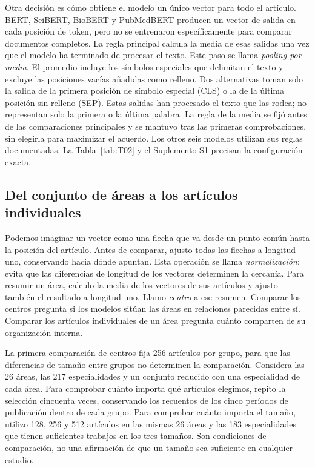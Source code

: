 \documentclass[12pt]{article}
\begin{document}
Otra decisión es cómo obtiene el modelo un único vector para todo el artículo. BERT, SciBERT, BioBERT y PubMedBERT producen un vector de salida en cada posición de token, pero no se entrenaron específicamente para comparar documentos completos. La regla principal calcula la media de esas salidas una vez que el modelo ha terminado de procesar el texto. Este paso se llama \emph{pooling por media}. El promedio incluye los símbolos especiales que delimitan el texto y excluye las posiciones vacías añadidas como relleno. Dos alternativas toman solo la salida de la primera posición de símbolo especial (CLS) o la de la última posición sin relleno (SEP). Estas salidas han procesado el texto que las rodea; no representan solo la primera o la última palabra. La regla de la media se fijó antes de las comparaciones principales y se mantuvo tras las primeras comprobaciones, sin elegirla para maximizar el acuerdo. Los otros seis modelos utilizan sus reglas documentadas. La Tabla~\ref{tab:T02} y el Suplemento S1 precisan la configuración exacta.


\subsection{Del conjunto de áreas a los artículos individuales}
Podemos imaginar un vector como una flecha que va desde un punto común hasta la posición del artículo. Antes de comparar, ajusto todas las flechas a longitud uno, conservando hacia dónde apuntan. Esta operación se llama \emph{normalización}; evita que las diferencias de longitud de los vectores determinen la cercanía. Para resumir un área, calculo la media de los vectores de sus artículos y ajusto también el resultado a longitud uno. Llamo \emph{centro} a ese resumen. Comparar los centros pregunta si los modelos sitúan las áreas en relaciones parecidas entre sí. Comparar los artículos individuales de un área pregunta cuánto comparten de su organización interna.

La primera comparación de centros fija 256 artículos por grupo, para que las diferencias de tamaño entre grupos no determinen la comparación. Considera las 26 áreas, las 217 especialidades y un conjunto reducido con una especialidad de cada área. Para comprobar cuánto importa qué artículos elegimos, repito la selección cincuenta veces, conservando los recuentos de los cinco períodos de publicación dentro de cada grupo. Para comprobar cuánto importa el tamaño, utilizo 128, 256 y 512 artículos en las mismas 26 áreas y las 183 especialidades que tienen suficientes trabajos en los tres tamaños. Son condiciones de comparación, no una afirmación de que un tamaño sea suficiente en cualquier estudio.
\end{document}
